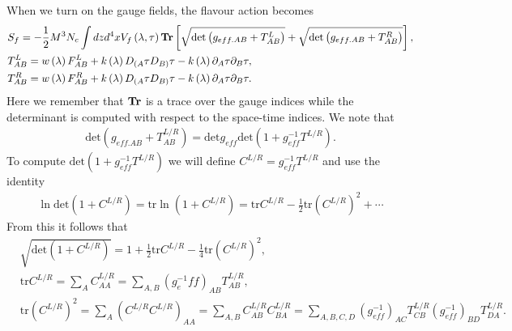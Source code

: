 \documentclass[10 pt]{article}
\begin{document}
When we turn on the gauge fields, the flavour action becomes
\begin{align}
&S_f = - \frac{1}{2} M^3 N_c \int dz d^4 x V_f \left( \lambda, \tau \right) \bold{Tr} \left[ \sqrt{\text{det} \left(g_{eff. AB} + T^{L}_{AB}\right)} + \sqrt{\text{det} \left(g_{eff. AB} + T^{R}_{AB}\right)} \right], \\
&T^{L}_{AB} = w\left(\lambda\right) F^{L}_{AB} + k\left(\lambda\right)D_{(A}\tau D_{B)}\tau -   k\left(\lambda\right) \partial_A \tau \partial_B \tau , \\
&T^{R}_{AB} = w\left(\lambda\right) F^{R}_{AB} + k\left(\lambda\right)D_{(A}\tau D_{B)}\tau - k\left(\lambda\right) \partial_A \tau \partial_B \tau .
\end{align}
Here we remember that $\bold{Tr}$ is a trace over the gauge indices while the determinant is computed with respect to the space-time indices. We note that
\begin{align}
\text{det}\left(g_{eff. AB} + T^{L/R}_{AB} \right) = \text{det}{g_{eff}}  \text{det} \left( 1 + g_{eff}^{-1} T^{L/R} \right).
\end{align}
To compute $\text{det} \left( 1 + g_{eff}^{-1} T^{L/R} \right)$ we will define $C^{L/R} = g_{eff}^{-1} T^{L/R}$ and use the identity
\begin{align}
\ln \text{det} \left(1+C^{L/R}\right) = \text{tr} \ln\left(1 + C^{L/R}\right) = \text{tr} C^{L/R} - \frac{1}{2} \text{tr} {\left(C^{L/R}\right)}^2 + \cdots
\end{align}
From this it follows that
\begin{align}
&\sqrt{\text{det}  \left(1+C^{L/R}\right)} = 1 + \frac{1}{2} \text{tr} C^{L/R} - \frac{1}{4} \text{tr} {\left(C^{L/R}\right)}^2, \\
& \text{tr} C^{L/R} = \sum_A C^{L/R}_{AA} = \sum _{A,B}  \left(g^{-1}_eff\right)_{AB} T^{L/R}_{AB}, \\
& \text{tr} {\left(C^{L/R}\right)}^2 =  \sum_A \left(C^{L/R} C^{L/R} \right)_{AA} = \sum_{A,B} C^{L/R}_{AB} C^{L/R}_{BA} = \sum_{A,B,C,D}  \left(g^{-1}_{eff}\right)_{AC} T^{L/R}_{CB} \left(g^{-1}_{eff}\right)_{BD} T^{L/R}_{DA}.
\end{align}
\end{document}
